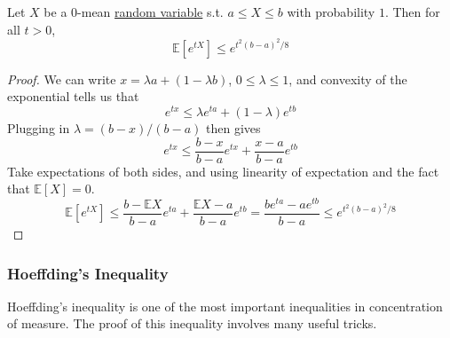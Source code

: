     \begin{lemma}
      \label{thm:hoeffdings-lemma}
    Let $X$ be a $0$-mean \hyperref[def:random-variable]{random variable} s.t. $a \leq X \leq b$ with probability $1$. Then for all $t > 0$, 
    \begin{equation}
      \mathbb{E}[ e^{t X}] \leq e^{t^2 (b - a)^2 / 8}
    \end{equation}
    \end{lemma}
    \begin{proof}
      We can write $x = \lambda a + (1 - \lambda b)$, $0 \leq \lambda \leq 1$, and convexity of the exponential tells us that 
      \begin{equation}
        e^{tx} \leq \lambda e^{ta} + (1 - \lambda) e^{tb}
      \end{equation}
      Plugging in $\lambda = (b - x) / (b - a)$ then gives 
      \begin{equation}
        e^{tx} \leq \frac{b - x}{b - a} e^{tx} + \frac{x - a}{b - a} e^{tb}
      \end{equation}
      Take expectations of both sides, and using linearity of expectation and the fact that $\mathbb{E}[X] = 0$. 
      \begin{equation}
        \mathbb{E}[e^{tX}] \leq \frac{b - \mathbb{E} X}{b - a} e^{ta} + \frac{\mathbb{E} X - a}{b - a} e^{tb} = \frac{b e^{ta} - a e^{tb}}{b - a} \leq e^{t^2 (b - a)^2 / 8}
      \end{equation}
    \end{proof}

  \subsubsection{Hoeffding's Inequality}

    Hoeffding's inequality is one of the most important inequalities in concentration of measure. The proof of this inequality involves many useful tricks. 

